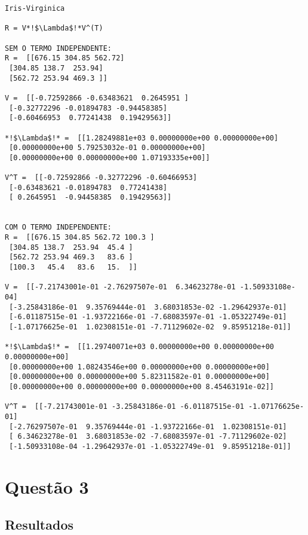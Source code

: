\documentclass[a4paper,12pt,twoside]{article}
\begin{document}
\begin{lstlisting}
Iris-Virginica

R = V*!$\Lambda$!*V^(T)

SEM O TERMO INDEPENDENTE: 
R =  [[676.15 304.85 562.72]
 [304.85 138.7  253.94]
 [562.72 253.94 469.3 ]]

V =  [[-0.72592866 -0.63483621  0.2645951 ]
 [-0.32772296 -0.01894783 -0.94458385]
 [-0.60466953  0.77241438  0.19429563]]

*!$\Lambda$!* =  [[1.28249881e+03 0.00000000e+00 0.00000000e+00]
 [0.00000000e+00 5.79253032e-01 0.00000000e+00]
 [0.00000000e+00 0.00000000e+00 1.07193335e+00]]

V^T =  [[-0.72592866 -0.32772296 -0.60466953]
 [-0.63483621 -0.01894783  0.77241438]
 [ 0.2645951  -0.94458385  0.19429563]]


COM O TERMO INDEPENDENTE: 
R =  [[676.15 304.85 562.72 100.3 ]
 [304.85 138.7  253.94  45.4 ]
 [562.72 253.94 469.3   83.6 ]
 [100.3   45.4   83.6   15.  ]]

V =  [[-7.21743001e-01 -2.76297507e-01  6.34623278e-01 -1.50933108e-04]
 [-3.25843186e-01  9.35769444e-01  3.68031853e-02 -1.29642937e-01]
 [-6.01187515e-01 -1.93722166e-01 -7.68083597e-01 -1.05322749e-01]
 [-1.07176625e-01  1.02308151e-01 -7.71129602e-02  9.85951218e-01]]

*!$\Lambda$!* =  [[1.29740071e+03 0.00000000e+00 0.00000000e+00 0.00000000e+00]
 [0.00000000e+00 1.08243546e+00 0.00000000e+00 0.00000000e+00]
 [0.00000000e+00 0.00000000e+00 5.82311582e-01 0.00000000e+00]
 [0.00000000e+00 0.00000000e+00 0.00000000e+00 8.45463191e-02]]

V^T =  [[-7.21743001e-01 -3.25843186e-01 -6.01187515e-01 -1.07176625e-01]
 [-2.76297507e-01  9.35769444e-01 -1.93722166e-01  1.02308151e-01]
 [ 6.34623278e-01  3.68031853e-02 -7.68083597e-01 -7.71129602e-02]
 [-1.50933108e-04 -1.29642937e-01 -1.05322749e-01  9.85951218e-01]]
\end{lstlisting}

\section{Questão 3}
\subsection{Resultados}
\end{document}
